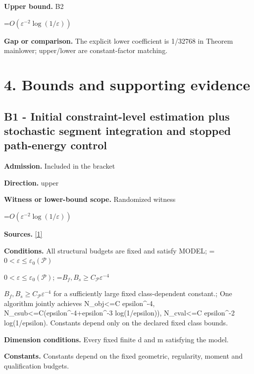 \documentclass[10pt,a4paper]{article}
\newcommand{\AtlasMath}[1]{\par\begingroup\centering\setbox0=\hbox{$\displaystyle #1$}\ifdim\wd0>1.4\linewidth\typeout{ATLAS WIDE FORMULA: \the\wd0}\fi\ifdim\wd0>\linewidth\resizebox{\linewidth}{!}{\box0}\else\box0\fi\par\endgroup}
\newcommand{\AtlasInlineMath}[1]{\begingroup\setbox0=\hbox{$#1$}\ifdim\wd0>.4\linewidth\endgroup\AtlasMath{#1}\else\endgroup$#1$\fi}
\begin{document}
\textbf{Upper bound.} B2



\AtlasMath{O(\varepsilon^{-2}\log(1/\varepsilon))}


\textbf{Gap or comparison.} The explicit lower coefficient is 1/32768 in Theorem mainlower; upper/lower are constant-factor matching.



\section{4. Bounds and supporting evidence}


\subsection{B1 - Initial constraint-level estimation plus stochastic segment integration and stopped path-energy control}


\textbf{Admission.} Included in the bracket



\textbf{Direction.} upper



\textbf{Witness or lower-bound scope.} Randomized witness



\AtlasMath{O(\varepsilon^{-2}\log(1/\varepsilon))}


\textbf{Sources.} \href{https://github.com/WU-Wendao/Colombo/blob/main/colombo_sensorium/Complexity_altas/data/sources/colombo/N10/manuscript.pdf}{[1]}



\textbf{Conditions.} All structural budgets are fixed and satisfy MODEL; \AtlasInlineMath{0<\varepsilon\le\varepsilon_0(\mathcal P)}; \AtlasInlineMath{B_f,B_s\ge C_{\mathcal P}\varepsilon^{-4}} for a sufficiently large fixed class-dependent constant.; One algorithm jointly achieves N\_obj<=C epsilon\textasciicircum{}-4, N\_csub<=C(epsilon\textasciicircum{}-4+epsilon\textasciicircum{}-3 log(1/epsilon)), N\_cval<=C epsilon\textasciicircum{}-2 log(1/epsilon). Constants depend only on the declared fixed class bounds.



\textbf{Dimension conditions.} Every fixed finite d and m satisfying the model.



\textbf{Constants.} Constants depend on the fixed geometric, regularity, moment and qualification budgets.
\end{document}
